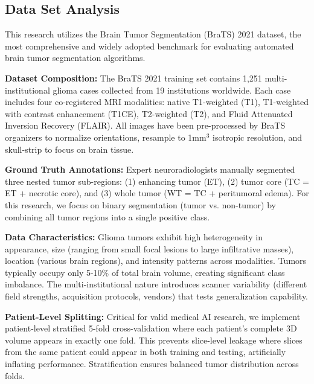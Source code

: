 \subsection{Data Set Analysis}

This research utilizes the Brain Tumor Segmentation (BraTS) 2021 dataset, the most comprehensive and widely adopted benchmark for evaluating automated brain tumor segmentation algorithms.

\textbf{Dataset Composition:} The BraTS 2021 training set contains 1,251 multi-institutional glioma cases collected from 19 institutions worldwide. Each case includes four co-registered MRI modalities: native T1-weighted (T1), T1-weighted with contrast enhancement (T1CE), T2-weighted (T2), and Fluid Attenuated Inversion Recovery (FLAIR). All images have been pre-processed by BraTS organizers to normalize orientations, resample to 1mm$^3$ isotropic resolution, and skull-strip to focus on brain tissue.

\textbf{Ground Truth Annotations:} Expert neuroradiologists manually segmented three nested tumor sub-regions: (1) enhancing tumor (ET), (2) tumor core (TC = ET + necrotic core), and (3) whole tumor (WT = TC + peritumoral edema). For this research, we focus on binary segmentation (tumor vs. non-tumor) by combining all tumor regions into a single positive class.

\textbf{Data Characteristics:} Glioma tumors exhibit high heterogeneity in appearance, size (ranging from small focal lesions to large infiltrative masses), location (various brain regions), and intensity patterns across modalities. Tumors typically occupy only 5-10\% of total brain volume, creating significant class imbalance. The multi-institutional nature introduces scanner variability (different field strengths, acquisition protocols, vendors) that tests generalization capability.

\textbf{Patient-Level Splitting:} Critical for valid medical AI research, we implement patient-level stratified 5-fold cross-validation where each patient's complete 3D volume appears in exactly one fold. This prevents slice-level leakage where slices from the same patient could appear in both training and testing, artificially inflating performance. Stratification ensures balanced tumor distribution across folds.


